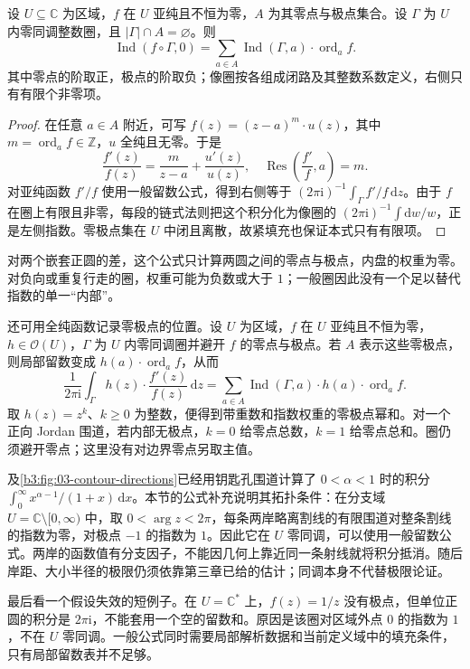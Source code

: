 \begin{corollary}[一般围道的辐角原理]\label{b3:cor:10-argument-general}
设 \(U\subseteq\mathbb C\) 为区域，\(f\) 在 \(U\) 亚纯且不恒为零，\(A\) 为其零点与极点集合。设 \(\Gamma\) 为 \(U\) 内零同调整数圈，且 \(|\Gamma|\cap A=\varnothing\)。则
\[
 \operatorname{Ind}(f\circ\Gamma,0)
 =\sum_{a\in A}\operatorname{Ind}(\Gamma,a)\cdot\operatorname{ord}_a f.
\]
其中零点的阶取正，极点的阶取负；像圈按各组成闭路及其整数系数定义，右侧只有有限个非零项。
\end{corollary}
\begin{proof}
在任意 \(a\in A\) 附近，可写 \(f(z)=(z-a)^m\cdot u(z)\)，其中 \(m=\operatorname{ord}_a f\in\mathbb Z\)，\(u\) 全纯且无零。于是
\[
 \frac{f'(z)}{f(z)}=\frac m{z-a}+\frac{u'(z)}{u(z)},
 \quad\operatorname{Res}\left(\frac{f'}f,a\right)=m.
\]
对亚纯函数 \(f'/f\) 使用一般留数公式，得到右侧等于 \((2\pi\mathrm i)^{-1}\int_\Gamma f'/f\,\mathrm dz\)。由于 \(f\) 在圈上有限且非零，每段的链式法则把这个积分化为像圈的 \((2\pi\mathrm i)^{-1}\int\mathrm dw/w\)，正是左侧指数。零极点集在 \(U\) 中闭且离散，故紧填充也保证本式只有有限项。
\end{proof}

对两个嵌套正圆的差，这个公式只计算两圆之间的零点与极点，内盘的权重为零。对负向或重复行走的圈，权重可能为负数或大于 \(1\)；一般圈因此没有一个足以替代指数的单一“内部”。

\ProseParagraphBreak
还可用全纯函数记录零极点的位置。设 \(U\) 为区域，\(f\) 在 \(U\) 亚纯且不恒为零，\(h\in\mathcal O(U)\)，\(\Gamma\) 为 \(U\) 内零同调圈并避开 \(f\) 的零点与极点。若 \(A\) 表示这些零极点，则局部留数变成 \(h(a)\cdot\operatorname{ord}_a f\)，从而
\[
 \frac1{2\pi\mathrm i}\int_\Gamma
 h(z)\cdot\frac{f'(z)}{f(z)}\,\mathrm dz
 =\sum_{a\in A}\operatorname{Ind}(\Gamma,a)
                 \cdot h(a)\cdot\operatorname{ord}_a f.
\]
取 \(h(z)=z^k\)、\(k\ge0\) 为整数，便得到带重数和指数权重的零极点幂和。对一个正向 Jordan 围道，若内部无极点，\(k=0\) 给零点总数，\(k=1\) 给零点总和。圈仍须避开零点；这里没有对边界零点另取主值。

\ProseParagraphBreak
{}及\cref{b3:fig:03-contour-directions}已经用钥匙孔围道计算了 \(0<\alpha<1\) 时的积分 \(\int_0^\infty x^{\alpha-1}/(1+x)\,\mathrm dx\)。本节的公式补充说明其拓扑条件：在分支域 \(U=\mathbb C\setminus[0,\infty)\) 中，取 \(0<\arg z<2\pi\)，每条两岸略离割线的有限围道对整条割线的指数为零，对极点 \(-1\) 的指数为 \(1\)。因此它在 \(U\) 零同调，可以使用一般留数公式。两岸的函数值有分支因子，不能因几何上靠近同一条射线就将积分抵消。随后岸距、大小半径的极限仍须依靠第三章已给的估计；同调本身不代替极限论证。

\ProseParagraphBreak
最后看一个假设失效的短例子。在 \(U=\mathbb C^*\) 上，\(f(z)=1/z\) 没有极点，但单位正圆的积分是 \(2\pi\mathrm i\)，不能套用一个空的留数和。原因是该圈对区域外点 \(0\) 的指数为 \(1\)，不在 \(U\) 零同调。一般公式同时需要局部解析数据和当前定义域中的填充条件，只有局部留数表并不足够。
